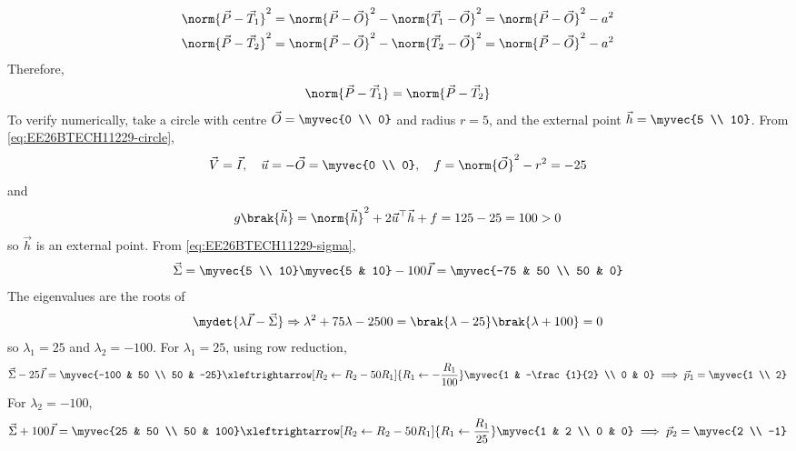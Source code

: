 \begin{enumerate}[label=\thesubsection.\arabic*, ref=\thesubsection.\theenumi]
\begin{align}
	\norm{\vec{P}-\vec{T}_1}^2 &= \norm{\vec{P}-\vec{O}}^2 - \norm{\vec{T}_1-\vec{O}}^2 = \norm{\vec{P}-\vec{O}}^2 - a^2
	\\
	\norm{\vec{P}-\vec{T}_2}^2 &= \norm{\vec{P}-\vec{O}}^2 - \norm{\vec{T}_2-\vec{O}}^2 = \norm{\vec{P}-\vec{O}}^2 - a^2
\end{align}
Therefore,
\begin{align}
	\norm{\vec{P}-\vec{T}_1} = \norm{\vec{P}-\vec{T}_2}
\end{align}
To verify numerically, take a circle with centre $\vec{O} = \myvec{0 \\ 0}$ and radius $r = 5$, and the external point $\vec{h} = \myvec{5 \\ 10}$. From \eqref{eq:EE26BTECH11229-circle},
\begin{align}
	\vec{V} = \vec{I}, \quad \vec{u} = -\vec{O} = \myvec{0 \\ 0}, \quad f = \norm{\vec{O}}^2 - r^2 = -25
\end{align}
and
\begin{align}
	g\brak{\vec{h}} = \norm{\vec{h}}^2 + 2\vec{u}^{\top}\vec{h} + f = 125 - 25 = 100 > 0
\end{align}
so $\vec{h}$ is an external point. From \eqref{eq:EE26BTECH11229-sigma},
\begin{align}
	\vec{\Sigma} = \myvec{5 \\ 10}\myvec{5 & 10} - 100\vec{I} = \myvec{-75 & 50 \\ 50 & 0}
\end{align}
The eigenvalues are the roots of
\begin{align}
	\mydet{\lambda\vec{I} - \vec{\Sigma}} \Rightarrow \lambda^2 + 75\lambda - 2500 = \brak{\lambda - 25}\brak{\lambda + 100} = 0
\end{align}
so $\lambda_1 = 25$ and $\lambda_2 = -100$. For $\lambda_1 = 25$, using row reduction,
\begin{align}
	\vec{\Sigma} - 25\vec{I} = \myvec{-100 & 50 \\ 50 & -25} \xleftrightarrow[R_2 \leftarrow R_2 - 50R_1]{R_1 \leftarrow -\frac{R_1}{100}} \myvec{1 & -\frac{1}{2} \\ 0 & 0} \implies \vec{p}_1 = \myvec{1 \\ 2}
\end{align}
For $\lambda_2 = -100$,
\begin{align}
	\vec{\Sigma} + 100\vec{I} = \myvec{25 & 50 \\ 50 & 100} \xleftrightarrow[R_2 \leftarrow R_2 - 50R_1]{R_1 \leftarrow \frac{R_1}{25}} \myvec{1 & 2 \\ 0 & 0} \implies \vec{p}_2 = \myvec{2 \\ -1}

\end{align}
\end{enumerate}
